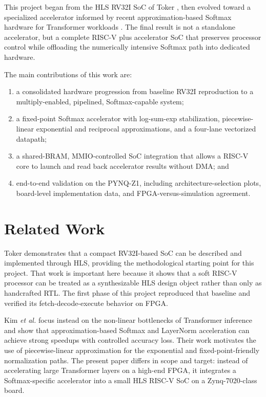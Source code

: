 \documentclass[conference]{IEEEtran}
\begin{document}
This project began from the HLS RV32I SoC of Toker \cite{toker2023hlsriscv}, then evolved toward a specialized accelerator informed by recent approximation-based Softmax hardware for Transformer workloads \cite{kim2025softmax}. The final result is not a standalone accelerator, but a complete RISC-V plus accelerator SoC that preserves processor control while offloading the numerically intensive Softmax path into dedicated hardware.

The main contributions of this work are:
\begin{enumerate}
\item a consolidated hardware progression from baseline RV32I reproduction to a multiply-enabled, pipelined, Softmax-capable system;
\item a fixed-point Softmax accelerator with log-sum-exp stabilization, piecewise-linear exponential and reciprocal approximations, and a four-lane vectorized datapath;
\item a shared-BRAM, MMIO-controlled SoC integration that allows a RISC-V core to launch and read back accelerator results without DMA; and
\item end-to-end validation on the PYNQ-Z1, including architecture-selection plots, board-level implementation data, and FPGA-versus-simulation agreement.
\end{enumerate}

\section{Related Work}
Toker \cite{toker2023hlsriscv} demonstrates that a compact RV32I-based SoC can be described and implemented through HLS, providing the methodological starting point for this project. That work is important here because it shows that a soft RISC-V processor can be treated as a synthesizable HLS design object rather than only as handcrafted RTL. The first phase of this project reproduced that baseline and verified its fetch-decode-execute behavior on FPGA.

Kim \emph{et al.} \cite{kim2025softmax} focus instead on the non-linear bottlenecks of Transformer inference and show that approximation-based Softmax and LayerNorm acceleration can achieve strong speedups with controlled accuracy loss. Their work motivates the use of piecewise-linear approximation for the exponential and fixed-point-friendly normalization paths. The present paper differs in scope and target: instead of accelerating large Transformer layers on a high-end FPGA, it integrates a Softmax-specific accelerator into a small HLS RISC-V SoC on a Zynq-7020-class board.
\end{document}
